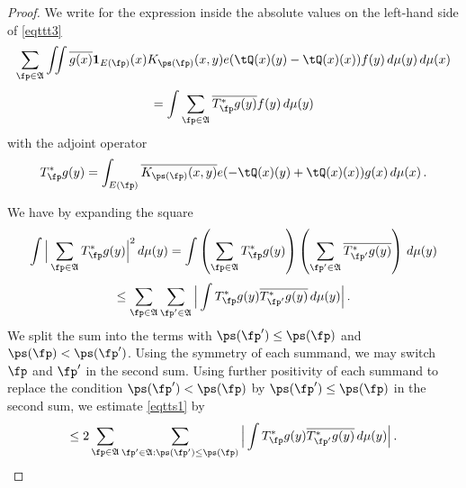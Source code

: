 \begin{proof}

 We write for the expression inside the absolute values on the left-hand side of \eqref{eqttt3}
\begin{equation}
  \sum_{\fp \in \mathfrak{A}}\iint \overline{g(x)} \mathbf{1}_{E(\fp)}(x)
  {K_{\ps(\fp)}(x,y)}e(\tQ(x)(y) -
   \tQ(x)(x))
   f(y)\, d\mu(y)\,d\mu(x)
\end{equation}
\begin{equation}
  =\int \sum_{\fp \in \mathfrak{A}} \overline{T_{\fp} ^*g(y)} f(y)\, d\mu(y)
\end{equation}
with the adjoint operator
\begin{equation}\label{eq-tstarwritten}
    T_{\fp}^*g(y)=\int_{E(\fp)} \overline{K_{\ps(\fp)}(x,y)}e(-\tQ(x)(y)+
    \tQ(x)(x))g(x)\, d\mu(x)\, .
\end{equation}





 We have by expanding the square
\begin{equation}
    \int \Big|\sum_{\fp\in \mathfrak{A}}T^*_{\fp}g(y)\Big|^2\, d\mu(y)=
    \int \left(\sum_{\fp\in \mathfrak{A}} T^*_{\fp}g(y)\right)
    \left(\sum_{\fp'\in \mathfrak{A}}\overline{T^*_{\fp'}g(y)}\right)\, d\mu(y)
\end{equation}
\begin{equation}\label{eqtts1}
    \le \sum_{\fp\in \mathfrak{A}} \sum_{\fp'\in \mathfrak{A}}
    \Big|\int T^*_{\fp}g(y)\overline{T^*_{\fp'}g(y)}\, d\mu(y)\Big|\,.
\end{equation}
We split the sum into the terms with $\ps(\fp')\le \ps(\fp)$
and $\ps(\fp)< \ps(\fp')$. Using the symmetry of each summand,
we may switch $\fp$ and $\fp'$ in the second sum. Using further positivity
of each summand to replace the condition $\ps(\fp')< \ps(\fp)$
by $\ps(\fp')\le \ps(\fp)$ in the second sum, we estimate \eqref{eqtts1} by
\begin{equation}\label{eqtts2}
    \le2 \sum_{\fp\in \mathfrak{A}} \sum_{\fp'\in \mathfrak{A}: \ps(\fp')\le \ps(\fp)}
    \Big|\int T^*_{\fp}g(y)\overline{T^*_{\fp'}g(y)}\, d\mu(y)\Big|\,.
\end{equation}


\end{proof}
